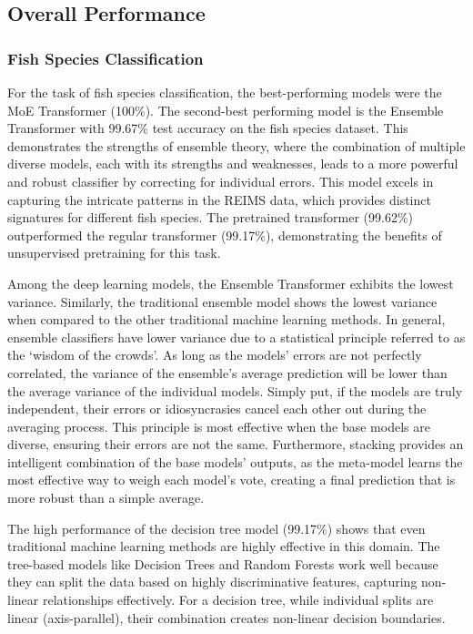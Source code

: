 \subsection{Overall Performance}

\subsubsection{Fish Species Classification}

For the task of fish species classification, the best-performing models were the MoE Transformer (100\%). 
The second-best performing model is the Ensemble Transformer with 99.67\% test accuracy on the fish species dataset. This demonstrates the strengths of ensemble theory, where the combination of multiple diverse models, each with its strengths and weaknesses, leads to a more powerful and robust classifier by correcting for individual errors. This model excels in capturing the intricate patterns in the REIMS data, which provides distinct signatures for different fish species. The pretrained transformer (99.62\%) outperformed the regular transformer (99.17\%), demonstrating the benefits of unsupervised pretraining for this task.

Among the deep learning models, the Ensemble Transformer exhibits the lowest variance. Similarly, the traditional ensemble model shows the lowest variance when compared to the other traditional machine learning methods. In general, ensemble classifiers have lower variance due to a statistical principle referred to as the `wisdom of the crowds'. As long as the models' errors are not perfectly correlated, the variance of the ensemble's average prediction will be lower than the average variance of the individual models. Simply put, if the models are truly independent, their errors or idiosyncrasies cancel each other out during the averaging process. This principle is most effective when the base models are diverse, ensuring their errors are not the same. Furthermore, stacking provides an intelligent combination of the base models' outputs, as the meta-model learns the most effective way to weigh each model's vote, creating a final prediction that is more robust than a simple average.

The high performance of the decision tree model (99.17\%) shows that even traditional machine learning methods are highly effective in this domain. 
The tree-based models like Decision Trees and Random Forests work well because they can split the data based on highly discriminative features, capturing non-linear relationships effectively. For a decision tree, while individual splits are linear (axis-parallel), their combination creates non-linear decision boundaries. 

